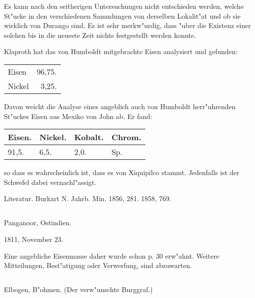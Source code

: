 \documentclass[a4paper, 11pt, oneside]{article}
\begin{document}
Es kann nach den seitherigen Untersuchungen nicht entschieden werden, welche St"ucke in den verschiedenen Sammlungen von derselben Lokalit"at und ob sie wirklich von Durango sind. Es ist sehr merkw"urdig, dass "uber die Existenz einer solchen bis in die neueste Zeit nichts festgestellt werden konnte.

Klaproth hat das von Humboldt mitgebrachte Eisen analysiert und gefunden:
\begin{table}[H]
    \centering\swabfamily\Large
    \begin{tabular}{l r}
        Eisen & 96,75. \\
        Nickel & 3,25. \\
    \end{tabular}
\end{table}

Davon weicht die Analyse eines angeblich auch von Humboldt herr"uhrenden St"uckes Eisen aus Mexiko von John ab. Er fand:
\begin{table}[H]
    \centering\swabfamily\Large
    \begin{tabular}{l l l l}
        Eisen. & Nickel. & Kobalt. & Chrom. \\ \hline
        91,5. & 6,5. & 2,0. & Sp. \\
    \end{tabular}
\end{table}

so dass es wahrscheinlich ist, dass es von Xiquipilco stammt. Jedenfalls ist der Schwefel dabei vernachl"assigt.

\normalsize
Literatur. Burkart N. Jahrb. Min. 1856, 281. 1858, 769.

\subsection{}
\LARGE
\paragraph{}
Panganoor, Ostindien.

1811, November 23.

Eine angebliche Eisenmasse daher wurde schon p. 30 erw"ahnt.
Weitere Mitteilungen, Best"atigung oder Verwerfung, sind abzuwarten.

\subsection{}
\LARGE
\paragraph{}
Elbogen, B"ohmen. (Der verw"unschte Burggraf.)
\end{document}
